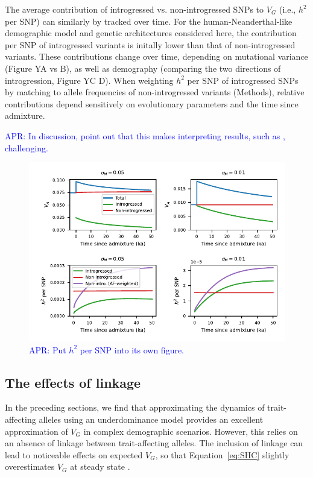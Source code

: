 \documentclass{article}
\newcommand{\aprcomment}[1]{{\textcolor{blue}{APR: #1}}}
\begin{document}
The average contribution of introgressed vs. non-introgressed SNPs to $V_G$
(i.e., $h^2$ per SNP) can similarly by tracked over time. For the
human-Neanderthal-like demographic model and genetic architectures considered
here, the contribution per SNP of introgressed variants is initally lower than
that of non-introgressed variants. These contributions change over time,
depending on mutational variance (Figure YA vs B), as well as demography
(comparing the two directions of introgression, Figure YC D). When weighting
$h^2$ per SNP of introgressed SNPs by matching to allele frequencies of
non-introgressed variants (Methods), relative contributions depend sensitively
on evolutionary parameters and the time since admixture.

\aprcomment{In discussion, point out that this makes interpreting results, such
as \cite{wei2023lingering}, challenging.}

\begin{figure}[t!]
    \centering
    \includegraphics{../figures/human_admixture.pdf}
    \caption{
        \textbf{}
        \aprcomment{Put $h^2$ per SNP into its own figure.}
    }
    \label{fig:human-to-neand}
\end{figure}

\subsection*{The effects of linkage}

In the preceding sections, we find that approximating the dynamics of
trait-affecting alleles using an underdominance model
\citep{robertson1956effect} provides an excellent approximation of $V_G$ in
complex demographic scenarios. However, this relies on an absence of linkage
between trait-affecting alleles. The inclusion of linkage can lead to
noticeable effects on expected $V_G$, so that Equation~\ref{eq:SHC} slightly
overestimates $V_G$ at steady state
\citep{burger1989much,burger1994distribution,walsh2018evolution}.
\end{document}
